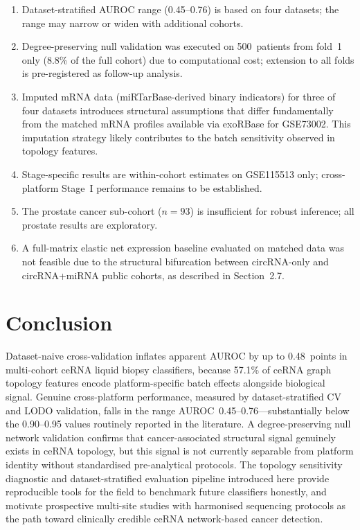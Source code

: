 \documentclass[12pt]{article}
\begin{document}
\begin{enumerate}
  \item Dataset-stratified AUROC range (0.45--0.76) is based on four
  datasets; the range may narrow or widen with additional cohorts.

  \item Degree-preserving null validation was executed on 500~patients
  from fold~1 only (8.8\% of the full cohort) due to computational
  cost; extension to all folds is pre-registered as follow-up analysis.

  \item Imputed mRNA data (miRTarBase-derived binary indicators) for
  three of four datasets introduces structural assumptions that differ
  fundamentally from the matched mRNA profiles available via exoRBase
  for GSE73002. This imputation strategy likely contributes to the
  batch sensitivity observed in topology features.

  \item Stage-specific results are within-cohort estimates on
  GSE115513 only; cross-platform Stage~I performance remains to be
  established.

  \item The prostate cancer sub-cohort ($n=93$) is insufficient for
  robust inference; all prostate results are exploratory.

  \item A full-matrix elastic net expression baseline evaluated on
  matched data was not feasible due to the structural bifurcation
  between circRNA-only and circRNA+miRNA public cohorts, as described
  in Section~2.7.
\end{enumerate}

\section{Conclusion}

Dataset-naive cross-validation inflates apparent AUROC by up to
0.48~points in multi-cohort ceRNA liquid biopsy classifiers, because
57.1\% of ceRNA graph topology features encode platform-specific batch
effects alongside biological signal. Genuine cross-platform performance,
measured by dataset-stratified CV and LODO validation, falls in the
range AUROC~0.45--0.76---substantially below the 0.90--0.95 values
routinely reported in the literature. A degree-preserving null network
validation confirms that cancer-associated structural signal genuinely
exists in ceRNA topology, but this signal is not currently separable
from platform identity without standardised pre-analytical protocols.
The topology sensitivity diagnostic and dataset-stratified evaluation
pipeline introduced here provide reproducible tools for the field to
benchmark future classifiers honestly, and motivate prospective
multi-site studies with harmonised sequencing protocols as the path
toward clinically credible ceRNA network-based cancer detection.
\end{document}
